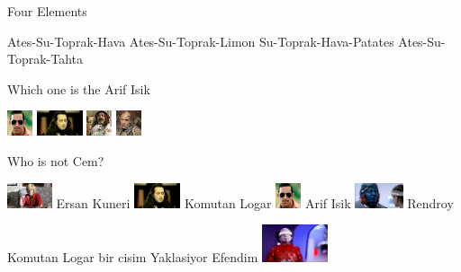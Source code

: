 \documentclass{exam}
\begin{document}
\begin{questions}
\question Four Elements\newline
\begin{oneparchoices}
\choice Ates-Su-Toprak-Hava
\choice Ates-Su-Toprak-Limon
\choice Su-Toprak-Hava-Patates
\CorrectChoice Ates-Su-Toprak-Tahta
\end{oneparchoices}
\question Which one is the Arif Isik\newline
\begin{oneparchoices}
\CorrectChoice \includegraphics[height=2em]{arifisik.jpg}
\choice \includegraphics[height=2em]{komutanlogar.jpeg}
\choice \includegraphics[height=2em]{faruk.jpg}
\choice \includegraphics[height=2em]{216.jpg}
\end{oneparchoices}
\question Who is not Cem?\newline
\begin{oneparchoices}
\choice \includegraphics[height=2em]{ersan.jpg}
Ersan Kuneri
\choice \includegraphics[height=2em]{komutanlogar.jpeg}
Komutan Logar
\choice \includegraphics[height=2em]{arifisik.jpg}
Arif Isik
\CorrectChoice \includegraphics[height=2em]{rendroy2.jpg}
Rendroy
\end{oneparchoices}
\question Komutan Logar bir cisim Yaklasiyor Efendim\newline
\includegraphics[height=3em]{tihulu.jpeg} \newline

\end{questions}
\end{document}
